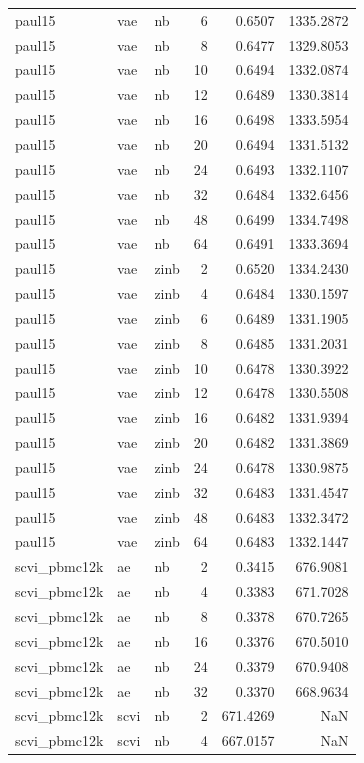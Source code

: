 \begin{tabular}{lllrrr}
paul15 & vae & nb & 6 & 0.6507 & 1335.2872 \\
paul15 & vae & nb & 8 & 0.6477 & 1329.8053 \\
paul15 & vae & nb & 10 & 0.6494 & 1332.0874 \\
paul15 & vae & nb & 12 & 0.6489 & 1330.3814 \\
paul15 & vae & nb & 16 & 0.6498 & 1333.5954 \\
paul15 & vae & nb & 20 & 0.6494 & 1331.5132 \\
paul15 & vae & nb & 24 & 0.6493 & 1332.1107 \\
paul15 & vae & nb & 32 & 0.6484 & 1332.6456 \\
paul15 & vae & nb & 48 & 0.6499 & 1334.7498 \\
paul15 & vae & nb & 64 & 0.6491 & 1333.3694 \\
paul15 & vae & zinb & 2 & 0.6520 & 1334.2430 \\
paul15 & vae & zinb & 4 & 0.6484 & 1330.1597 \\
paul15 & vae & zinb & 6 & 0.6489 & 1331.1905 \\
paul15 & vae & zinb & 8 & 0.6485 & 1331.2031 \\
paul15 & vae & zinb & 10 & 0.6478 & 1330.3922 \\
paul15 & vae & zinb & 12 & 0.6478 & 1330.5508 \\
paul15 & vae & zinb & 16 & 0.6482 & 1331.9394 \\
paul15 & vae & zinb & 20 & 0.6482 & 1331.3869 \\
paul15 & vae & zinb & 24 & 0.6478 & 1330.9875 \\
paul15 & vae & zinb & 32 & 0.6483 & 1331.4547 \\
paul15 & vae & zinb & 48 & 0.6483 & 1332.3472 \\
paul15 & vae & zinb & 64 & 0.6483 & 1332.1447 \\
scvi\_pbmc12k & ae & nb & 2 & 0.3415 & 676.9081 \\
scvi\_pbmc12k & ae & nb & 4 & 0.3383 & 671.7028 \\
scvi\_pbmc12k & ae & nb & 8 & 0.3378 & 670.7265 \\
scvi\_pbmc12k & ae & nb & 16 & 0.3376 & 670.5010 \\
scvi\_pbmc12k & ae & nb & 24 & 0.3379 & 670.9408 \\
scvi\_pbmc12k & ae & nb & 32 & 0.3370 & 668.9634 \\
scvi\_pbmc12k & scvi & nb & 2 & 671.4269 & NaN \\
scvi\_pbmc12k & scvi & nb & 4 & 667.0157 & NaN \\

\end{tabular}
